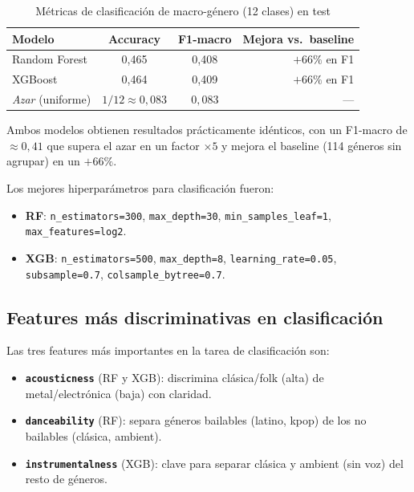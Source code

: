 \documentclass[12pt, a4paper, twoside]{book}
\theoremstyle{definition}
\begin{document}
\begin{table}[H]
\centering
\caption{Métricas de clasificación de macro-género (12 clases) en test}
\label{tab:clf_metrics}
\begin{tabular}{lccr}
\toprule
\textbf{Modelo} & \textbf{Accuracy} & \textbf{F1-macro} & \textbf{Mejora vs.\ baseline} \\
\midrule
Random Forest & 0{,}465 & 0{,}408 & $+66\%$ en F1 \\
XGBoost       & 0{,}464 & 0{,}409 & $+66\%$ en F1 \\
\midrule
\textit{Azar} (uniforme) & $1/12 \approx 0{,}083$ & $0{,}083$ & --- \\
\bottomrule
\end{tabular}
\end{table}

Ambos modelos obtienen resultados prácticamente idénticos, con un F1-macro
de $\approx 0{,}41$ que supera el azar en un factor $\times 5$ y mejora el
baseline (114 géneros sin agrupar) en un $+66\%$.

Los mejores hiperparámetros para clasificación fueron:
\begin{itemize}
  \item \textbf{RF}: \texttt{n\_estimators=300}, \texttt{max\_depth=30},
        \texttt{min\_samples\_leaf=1}, \texttt{max\_features=log2}.
  \item \textbf{XGB}: \texttt{n\_estimators=500}, \texttt{max\_depth=8},
        \texttt{learning\_rate=0.05}, \texttt{subsample=0.7},
        \texttt{colsample\_bytree=0.7}.
\end{itemize}

\subsection{Features más discriminativas en clasificación}

Las tres features más importantes en la tarea de clasificación son:

\begin{itemize}
  \item \textbf{\texttt{acousticness}} (RF y XGB): discrimina clásica/folk
        (alta) de metal/electrónica (baja) con claridad.
  \item \textbf{\texttt{danceability}} (RF): separa géneros bailables (latino,
        kpop) de los no bailables (clásica, ambient).
  \item \textbf{\texttt{instrumentalness}} (XGB): clave para separar clásica y
        ambient (sin voz) del resto de géneros.
\end{itemize}
\end{document}
